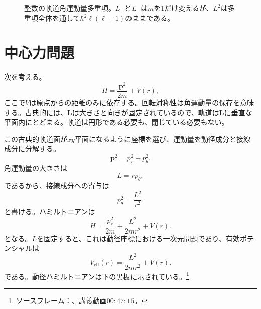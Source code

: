 \begin{figure}[htbp]
\centering
{}
\caption{整数の軌道角運動量多重項。\(L_+\)と\(L_-\)は\(m\)を1だけ変えるが、\(L^2\)は多重項全体を通して\(\hbar^2\ell(\ell+1)\)のままである。}
\end{figure}

\section{中心力問題}

次を考える。
\begin{equation}
H=\frac{\mathbf p^2}{2m}+V(r),
\end{equation}
ここで\(V\)は原点からの距離のみに依存する。回転対称性は角運動量の保存を意味する。古典的には、\(\mathbf L\)は大きさと向きが固定されているので、軌道は\(\mathbf L\)に垂直な平面内にとどまる。軌道は円形である必要も、閉じている必要もない。

この古典的軌道面が\(xy\)平面になるように座標を選び、運動量を動径成分と接線成分に分解する。
\begin{equation}
\mathbf p^2=p_r^2+p_\theta^2.
\end{equation}
角運動量の大きさは
\begin{equation}
L=r p_\theta,
\end{equation}
であるから、接線成分への寄与は
\begin{equation}
p_\theta^2=\frac{L^2}{r^2}.
\end{equation}
と書ける。ハミルトニアンは
\begin{equation}
H=\frac{p_r^2}{2m}+\frac{L^2}{2mr^2}+V(r).
\end{equation}
となる。\(L\)を固定すると、これは動径座標における一次元問題であり、有効ポテンシャルは
\begin{equation}
V_{\mathrm{eff}}(r)=\frac{L^2}{2mr^2}+V(r).
\end{equation}
である。動径ハミルトニアンは下の黒板に示されている。\footnote{ソースフレーム：\texttt{}、講義動画\(00{:}47{:}15\)。}

